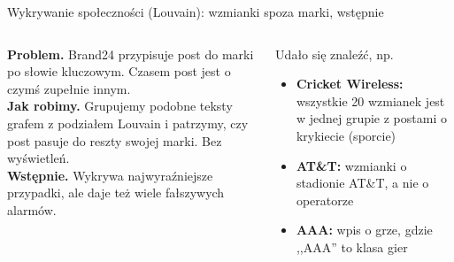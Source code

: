 \documentclass[aspectratio=169,10pt]{beamer}
\begin{document}
\begin{frame}{Wykrywanie społeczności (Louvain): wzmianki spoza marki, wstępnie}
\begin{columns}[T]
\normalsize
\textbf{Problem.} Brand24 przypisuje post do marki po słowie kluczowym. Czasem post jest o czymś zupełnie innym.\\[6pt]
\textbf{Jak robimy.} Grupujemy podobne teksty grafem z podziałem Louvain i patrzymy, czy post pasuje do reszty swojej marki. Bez wyświetleń.\\[6pt]
\textbf{Wstępnie.} Wykrywa najwyraźniejsze przypadki, ale daje też wiele fałszywych alarmów.
\begin{block}{Udało się znaleźć, np.}\small
\begin{itemize}\setlength\itemsep{4pt}
\item \textbf{Cricket Wireless:} wszystkie 20 wzmianek jest w jednej grupie z postami o krykiecie (sporcie)
\item \textbf{AT\&T:} wzmianki o stadionie AT\&T, a nie o operatorze
\item \textbf{AAA:} wpis o grze, gdzie ,,AAA'' to klasa gier
\end{itemize}
\end{block}
\end{columns}
\end{frame}
\end{document}
